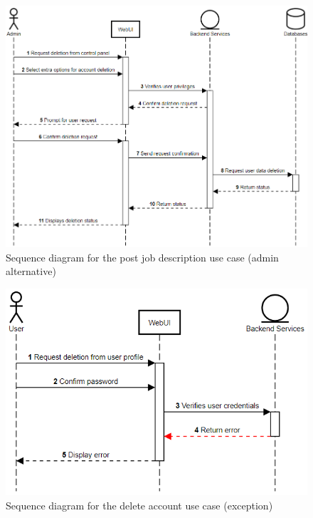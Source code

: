 \documentclass[a4paper]{article}
\begin{document}
    \begin{figure}[H]
        \centering
        \includegraphics[width=1.0\textwidth]{delete_account (admin).png}
        \caption{Sequence diagram for the post job description use case (admin alternative)}
        \label{fig:fig18}
    \end{figure}

    \begin{figure}[H]
        \centering
        \includegraphics[width=1.0\textwidth]{delete_account (exception).png}
        \caption{Sequence diagram for the delete account use case (exception)}
        \label{fig:fig19}
    \end{figure}
\end{document}
